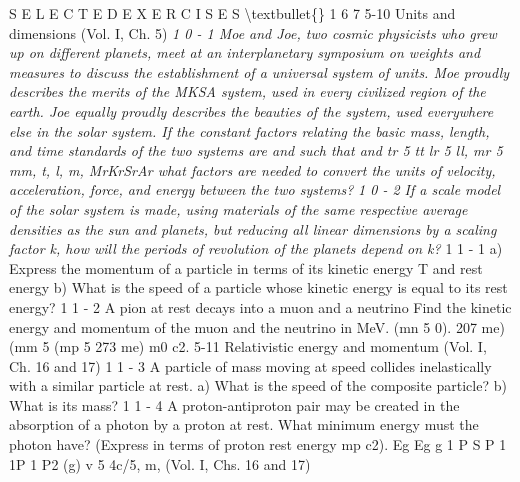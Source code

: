 \documentclass[10pt,oneside]{article}
\begin{document}
S E L E C T E D  E X E R C I S E S \textbackslash{}textbullet\{\} 1 6 7 5-10 Units and dimensions (Vol. I, Ch. 5) \emph{ 1 0 - 1 Moe and Joe, two cosmic physicists who grew up on different planets, meet at an interplanetary symposium on weights and measures to discuss the establishment of a universal system of units. Moe proudly describes the merits of the MKSA system, used in every civilized region of the earth. Joe equally proudly describes the beauties of the system, used everywhere else in the solar system. If the constant factors relating the basic mass, length, and time standards of the two systems are and such that and tr 5 tt lr 5 ll, mr 5 mm, t, l, m, MrKrSrAr what factors are needed to convert the units of velocity, acceleration, force, and energy between the two systems? } \emph{ 1 0 - 2 If a scale model of the solar system is made, using materials of the same respective average densities as the sun and planets, but reducing all linear dimensions by a scaling factor k, how will the periods of revolution of the planets depend on k? } 1 1 - 1 a) Express the momentum of a particle in terms of its kinetic energy T and rest energy b) What is the speed of a particle whose kinetic energy is equal to its rest energy? \emph{ } 1 1 - 2 A pion at rest decays into a muon and a neutrino Find the kinetic energy and momentum of the muon and the neutrino in MeV. (mn 5 0). 207 me) (mm 5 (mp 5 273 me) m0 c2. 5-11 Relativistic energy and momentum (Vol. I, Ch. 16 and 17) \emph{ } 1 1 - 3 A particle of mass moving at speed collides inelastically with a similar particle at rest. a) What is the speed of the composite particle? b) What is its mass? \emph{ } 1 1 - 4 A proton-antiproton pair may be created in the absorption of a photon by a proton at rest. What minimum energy must the photon have? (Express in terms of proton rest energy mp c2). Eg Eg g 1 P S P 1 1P 1 P2 (g) v 5 4c/5, m, (Vol. I, Chs. 16 and 17)\par
\end{document}
